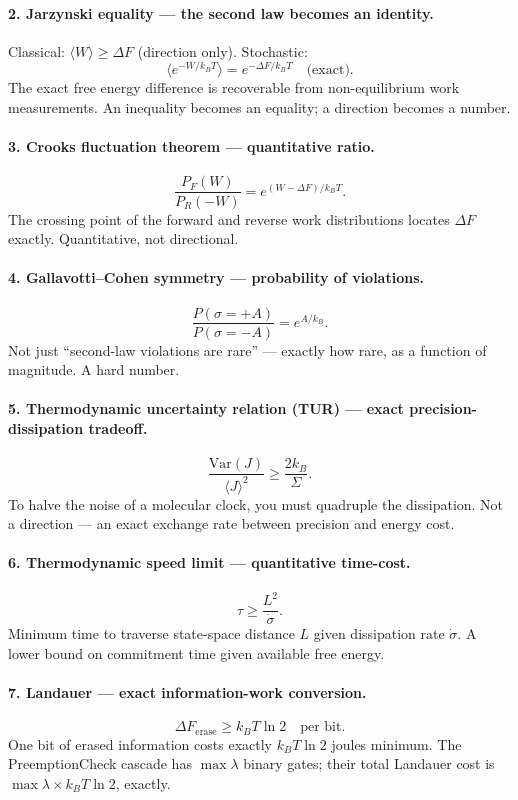 \documentclass[11pt,a4paper]{article}
\begin{document}
\paragraph{2. Jarzynski equality --- the second law becomes an identity.}
Classical: $\langle W \rangle \geq \Delta F$ (direction only).
Stochastic:
\[
  \bigl\langle e^{-W/k_BT} \bigr\rangle = e^{-\Delta F / k_BT} \quad \text{(exact).}
\]
The exact free energy difference is recoverable from non-equilibrium work
measurements.  An inequality becomes an equality; a direction becomes a
number.

\paragraph{3. Crooks fluctuation theorem --- quantitative ratio.}
\[
  \frac{P_F(W)}{P_R(-W)} = e^{(W - \Delta F)/k_BT}.
\]
The crossing point of the forward and reverse work distributions locates
$\Delta F$ exactly.  Quantitative, not directional.

\paragraph{4. Gallavotti--Cohen symmetry --- probability of violations.}
\[
  \frac{P(\sigma = +A)}{P(\sigma = -A)} = e^{A/k_B}.
\]
Not just ``second-law violations are rare'' --- exactly how rare, as a
function of magnitude.  A hard number.

\paragraph{5. Thermodynamic uncertainty relation (TUR) --- exact precision-dissipation tradeoff.}
\[
  \frac{\mathrm{Var}(J)}{\langle J\rangle^2} \geq \frac{2k_B}{\Sigma}.
\]
To halve the noise of a molecular clock, you must quadruple the dissipation.
Not a direction --- an exact exchange rate between precision and energy cost.

\paragraph{6. Thermodynamic speed limit --- quantitative time-cost.}
\[
  \tau \geq \frac{L^2}{\dot\sigma}.
\]
Minimum time to traverse state-space distance $L$ given dissipation rate
$\dot\sigma$.  A lower bound on commitment time given available free energy.

\paragraph{7. Landauer --- exact information-work conversion.}
\[
  \Delta F_{\text{erase}} \geq k_BT \ln 2 \quad \text{per bit.}
\]
One bit of erased information costs exactly $k_BT \ln 2$ joules minimum.
The PreemptionCheck cascade has $\max\lambda$ binary gates; their total
Landauer cost is $\max\lambda \times k_BT \ln 2$, exactly.
\end{document}
